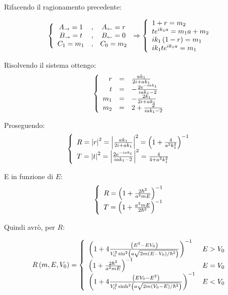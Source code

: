Rifacendo il ragionamento precedente:

\begin{equation}
\lr\{.{\begin{array}{ccc}
	A_\to = 1&,&
	A_\from = r\\
	B_\to = t&,&
	B_\from=0\\
	C_1 = m_1&,&
	C_0 = m_2
	\end{array}} \Rightarrow\lr\{.{\begin{array}{l}
	1+r= m_2 \\
	t e^{ik_1a} = m_1 a + m_2\\
	i k_1\lrt{1 - r} = m_1\\
	i k_1 t e^{ik_1a} = m_1
	\end{array}}
\end{equation}

Risolvendo il sistema ottengo:
\begin{equation}
\lr\{.{\begin{array}{rcl}
	r	&=& \frac{a k_1}{2 i + a k_1}\\
	t	&=& -\frac{2 e^{-i a k_1}}{i a k_1 - 2}\\
	m_1	&=& -\frac{2 k_1}{2 i + a k_1}\\
	m_2	&=& 2+\frac{2}{i a k_1 - 2}
	\end{array}}
\end{equation}

Proseguendo:
\begin{equation}
\lr\{.{\begin{array}{l}
	R = \lr||{r}^2 = \lr||{\frac{a k_1}{2 i + a k_1}}^2=
	\lrt{1+\frac{4}{a^2k_1^2}}^{-1}\\
	T = \lr||{t}^2 = \lr||{\frac{2 e^{-i a k_1}}{i a k_1 - 2}}^2=
	\frac{4}{4+a^2k_1^2}
	\end{array}}
\end{equation}

E in funzione di $E$:
\begin{equation}
\lr\{.{\begin{array}{l}
	R = \lrt{1+\frac{2\hbar^2}{ a^2 m E}}^{-1}\\
	T = \lrt{1 + \frac{a^2 m E}{2\hbar^2}}^{-1}
	\end{array}}
\end{equation}

Quindi avr\`o, per $R$:

\begin{equation}\label{eq:riflessionevanilla}
R\lrt{m,E,V_0} = \lr\{.{\begin{array}{lr}
	\lrt{1+4 \frac{\lrt{E^2 - EV_0}}{V_0^2\sin^2\lrt{a \sqrt{2m \lrt{E-V_0}/\hbar^2}}}}^{-1} & E>V_0 \\
	\lrt{1+\frac{2\hbar^2}{ a^2 m E}}^{-1}                                                   & E=V_0 \\
	\lrt{1+4 \frac{\lrt{EV_0-E^2}}{V_0^2\sinh^2\lrt{a \sqrt{2m \lrt{V_0-E}/\hbar^2}}}}^{-1}  & E<V_0
\end{array}}
\end{equation}

